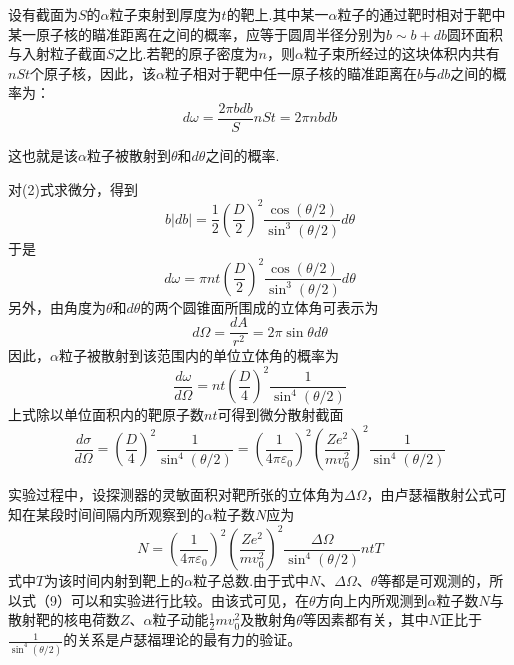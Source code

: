 \documentclass{article}
\begin{document}
\begin{enumerate}
  设有截面为$S$的$\alpha$粒子束射到厚度为$t$的靶上.其中某一$\alpha$粒子的通过靶时相对于靶中某一原子核的瞄准距离在之间的概率，应等于圆周半径分别为$b\sim b+db$圆环面积与入射粒子截面$S$之比.若靶的原子密度为$n$，则$\alpha$粒子束所经过的这块体积内共有$nSt$个原子核，因此，该$\alpha$粒子相对于靶中任一原子核的瞄准距离在$b$与$db$之间的概率为：
  \begin{equation}
    d\omega = \frac{2\pi bdb}{S}nSt = 2\pi n b db
  \end{equation}
  
  这也就是该$\alpha$粒子被散射到$\theta$和$d\theta$之间的概率.
  
  对(2)式求微分，得到
  \begin{equation}
    b|db| = \frac{1}{2}(\frac{D}{2})^2\frac{\cos(\theta/2)}{\sin^3(\theta/2)}d\theta
  \end{equation}
  于是
  \begin{equation}
    d\omega = \pi nt(\frac{D}{2})^2\frac{\cos(\theta/2)}{\sin^3(\theta/2)}d\theta
  \end{equation}
  另外，由角度为$\theta$和$d\theta$的两个圆锥面所围成的立体角可表示为
  \begin{equation}
    d\Omega = \frac{dA}{r^2} = 2\pi\sin\theta d\theta
  \end{equation}
  因此，$\alpha$粒子被散射到该范围内的单位立体角的概率为
  \begin{equation}
    \frac{d\omega}{d\Omega} = nt(\frac{D}{4})^2\frac{1}{\sin^4(\theta/2)}
  \end{equation}
  上式除以单位面积内的靶原子数$nt$可得到微分散射截面
  \begin{equation}
    \frac{d\sigma}{d\Omega} = (\frac{D}{4})^2\frac{1}{\sin^4(\theta/2)}=(\frac{1}{4\pi\varepsilon_0})^2(\frac{Ze^2}{mv_0^2})^2\frac{1}{\sin^4(\theta/2)}
  \end{equation}
  
  实验过程中，设探测器的灵敏面积对靶所张的立体角为$\Delta\Omega$，由卢瑟福散射公式可知在某段时间间隔内所观察到的$\alpha$粒子数$N$应为
  \begin{equation}
    N = (\frac{1}{4\pi\varepsilon_0})^2(\frac{Ze^2}{mv_0^2})^2\frac{\Delta\Omega}{\sin^4(\theta/2)}ntT
  \end{equation}
  式中$T$为该时间内射到靶上的$\alpha$粒子总数.由于式中$N$、$\Delta\Omega$、$\theta$等都是可观测的，所以式（9）可以和实验进行比较。由该式可见，在$\theta$方向上内所观测到$\alpha$粒子数$N$与散射靶的核电荷数$Z$、$\alpha$粒子动能$\frac{1}{2}mv_0^2$及散射角$\theta$等因素都有关，其中$N$正比于$\frac{1}{\sin^4(\theta/2)}$的关系是卢瑟福理论的最有力的验证。
  
\end{enumerate}
\end{document}

